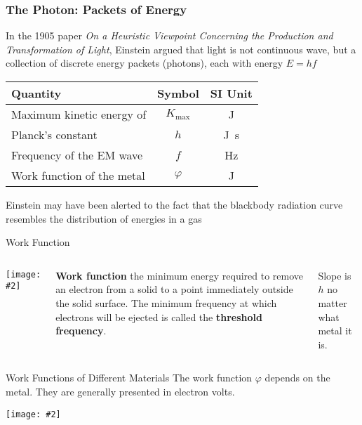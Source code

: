 \documentclass[12pt,compress,aspectratio=169]{beamer}
\newcommand{\pic}[2]{\texttt{[image: \#2]}}
\newcommand{\eq}[2]{\vspace{#1}{\Large\begin{displaymath}#2\end{displaymath}}}
\begin{document}
\begin{frame}
  \frametitle{The Photon: Packets of Energy}
  In the 1905 paper \emph{On a Heuristic Viewpoint Concerning the Production and
    Transformation of Light}, Einstein argued that light is not continuous
  wave, but a collection of discrete energy packets (photons), each with energy
  $E=hf$

  \eq{-.22in}{
    \boxed{K_\text{max}=
      \begin{cases}
        hf-\varphi & \text{if }hf>\varphi\\
        0          & \text{otherwise}
      \end{cases}
    }
  }
  \begin{center}
    \begin{tabular}{l|c|c}
      \rowcolor{pink}
      \textbf{Quantity} & \textbf{Symbol} & \textbf{SI Unit} \\ \hline
      Maximum kinetic energy of   & $K_\text{max}$ & \si{\joule}\\
      Planck's constant           & $h$   & \si{\joule.\second}\\
      Frequency of the EM wave    & $f$   & \si{\hertz}\\
      Work function of the metal  & $\varphi$ & \si{\joule}
    \end{tabular}
  \end{center}
  Einstein may have been alerted to the fact that the blackbody radiation curve
  resembles the distribution of energies in a gas
\end{frame}



\begin{frame}{Work Function}
  \begin{columns}
  \pic{1}{550px-Photoelectric_effect_diagram}
  
  \textbf{Work function} the minimum energy required to remove an electron
  from a solid to a point immediately outside the solid surface. The minimum
  frequency at which electrons will be ejected is called the
  \textbf{threshold frequency}.

  \vspace{.15in}Slope is $h$ no matter what metal it is.
  \end{columns}
\end{frame}



\begin{frame}{Work Functions of Different Materials}
  The work function $\varphi$ depends on the metal. They are generally presented
  in electron volts.
  \begin{center}
    \pic{.35}{work-function}
  \end{center}
\end{frame}
\end{document}
